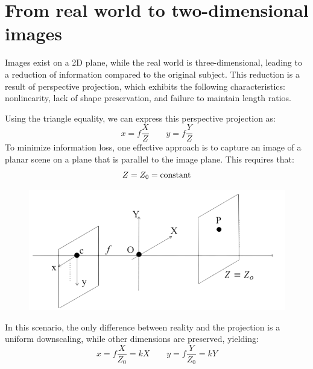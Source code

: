 \section{From real world to two-dimensional images}

Images exist on a 2D plane, while the real world is three-dimensional, leading to a reduction of information compared to the original subject.
This reduction is a result of perspective projection, which exhibits the following characteristics: nonlinearity, lack of shape preservation, and failure to maintain length ratios.

Using the triangle equality, we can express this perspective projection as:
\[x=f \dfrac{X}{Z} \qquad y=f \dfrac{Y}{Z}\]
To minimize information loss, one effective approach is to capture an image of a planar scene on a plane that is parallel to the image plane. 
This requires that:
\[Z=Z_0=\textnormal{constant}\]
\begin{figure}[H]
    \centering
    \includegraphics[width=0.5\linewidth]{images/Z0.png}
\end{figure}
In this scenario, the only difference between reality and the projection is a uniform downscaling, while other dimensions are preserved, yielding:
\[x=f \dfrac{X}{Z_0}=kX \qquad y=f \dfrac{Y}{Z_0}=kY \]